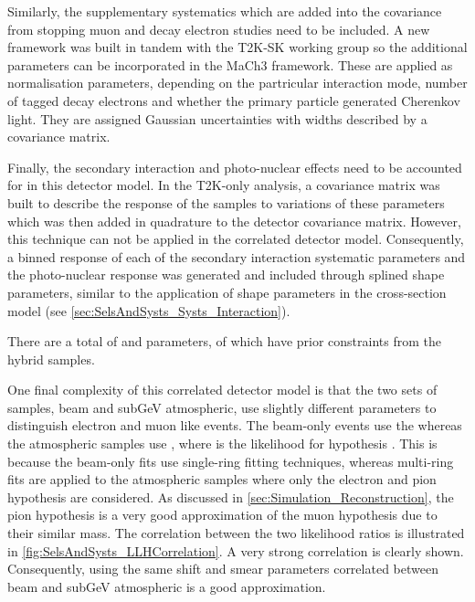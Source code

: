 Similarly, the supplementary systematics which are added into the covariance from stopping muon and decay electron studies need to be included. A new framework \cite{t2ksk-common} was built in tandem with the T2K-SK working group \cite{t2k_tn_326} so the additional parameters can be incorporated in the MaCh3 framework. These are applied as normalisation parameters, depending on the partricular interaction mode, number of tagged decay electrons and whether the primary particle generated Cherenkov light. They are assigned Gaussian uncertainties with widths described by a covariance matrix.

Finally, the secondary interaction and photo-nuclear effects need to be accounted for in this detector model. In the T2K-only analysis, a covariance matrix was built to describe the response of the samples to variations of these parameters which was then added in quadrature to the detector covariance matrix. However, this technique can not be applied in the correlated detector model. Consequently, a binned response of each of the secondary interaction systematic parameters and the photo-nuclear response was generated and included through splined shape parameters, similar to the application of shape parameters in the cross-section model (see \autoref{sec:SelsAndSysts_Systs_Interaction}).

There are a total of   and  parameters, of which  have prior constraints from the hybrid  samples.

One final complexity of this correlated detector model is that the two sets of samples, beam and subGeV atmospheric, use slightly different parameters to distinguish electron and muon like events. The beam-only events use the  whereas the atmospheric samples use , where  is the likelihood for hypothesis . This is because the beam-only fits use single-ring \fq fitting techniques, whereas multi-ring fits are applied to the atmospheric samples where only the electron and pion hypothesis are considered. As discussed in \autoref{sec:Simulation_Reconstruction}, the pion hypothesis is a very good approximation of the muon hypothesis due to their similar mass. The correlation between the two likelihood ratios is illustrated in \autoref{fig:SelsAndSysts_LLHCorrelation}. A very strong correlation is clearly shown. Consequently, using the same shift and smear parameters correlated between beam and subGeV atmospheric is a good approximation.

